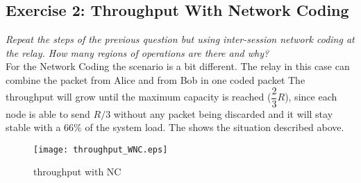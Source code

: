 \subsection{Exercise 2: Throughput With Network Coding}
\textit{Repeat the steps of the previous question but using inter-session network coding at the relay. How many regions of operations are there and why?}\\

For the Network Coding the scenario is a bit different. The relay in this case can combine the packet from Alice and from Bob in one coded packet The throughput will grow until the maximum capacity is reached ($\dfrac{2}{3} R $), since each node is able to send $R/3$ without any packet being discarded and it will stay stable with a $66 \%$ of the system load. The  shows the situation described above.
\begin{figure}[!h]
  \centering
  \texttt{[image: throughput\_WNC.eps]}
  \caption{throughput with NC}
  \label{fig:throughput_WNC}
\end{figure}
